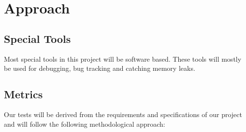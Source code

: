 \documentclass[english,12pt]{article}
\begin{document}
\section{Approach}
\subsection{Special Tools}
Most special tools in this project will be software based. These tools will mostly be used for 
debugging, bug tracking and catching memory leaks. 
\subsection{Metrics}
Our tests will be derived from the requirements and specifications of our project and will follow 
the following methodological approach:
\end{document}
